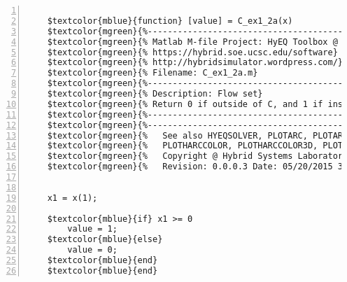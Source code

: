 %  
%  
%  
%  
  
  
\DefineShortVerb[fontfamily=courier,fontseries=m]{\$} 
\DefineShortVerb[fontfamily=courier,fontseries=b]{\#} 
  
\begin{Verbatim}[commandchars=\$\{\},numbers=left,numbersep=2pt] 

    $textcolor{mblue}{function} [value] = C_ex1_2a(x)  
    $textcolor{mgreen}{%--------------------------------------------------------------------------} 
    $textcolor{mgreen}{% Matlab M-file Project: HyEQ Toolbox @  Hybrid Systems Laboratory (HSL), } 
    $textcolor{mgreen}{% https://hybrid.soe.ucsc.edu/software} 
    $textcolor{mgreen}{% http://hybridsimulator.wordpress.com/} 
    $textcolor{mgreen}{% Filename: C_ex1_2a.m} 
    $textcolor{mgreen}{%--------------------------------------------------------------------------} 
    $textcolor{mgreen}{% Description: Flow set} 
    $textcolor{mgreen}{% Return 0 if outside of C, and 1 if inside C} 
    $textcolor{mgreen}{%--------------------------------------------------------------------------} 
    $textcolor{mgreen}{%--------------------------------------------------------------------------} 
    $textcolor{mgreen}{%   See also HYEQSOLVER, PLOTARC, PLOTARC3, PLOTFLOWS, PLOTHARC,} 
    $textcolor{mgreen}{%   PLOTHARCCOLOR, PLOTHARCCOLOR3D, PLOTHYBRIDARC, PLOTJUMPS.} 
    $textcolor{mgreen}{%   Copyright @ Hybrid Systems Laboratory (HSL),} 
    $textcolor{mgreen}{%   Revision: 0.0.0.3 Date: 05/20/2015 3:42:00} 
     
     
    x1 = x(1); 
     
    $textcolor{mblue}{if} x1 >= 0 
        value = 1; 
    $textcolor{mblue}{else} 
        value = 0; 
    $textcolor{mblue}{end} 
    $textcolor{mblue}{end}  
\end{Verbatim}  
  
\UndefineShortVerb{\$} 
\UndefineShortVerb{\#} 
 